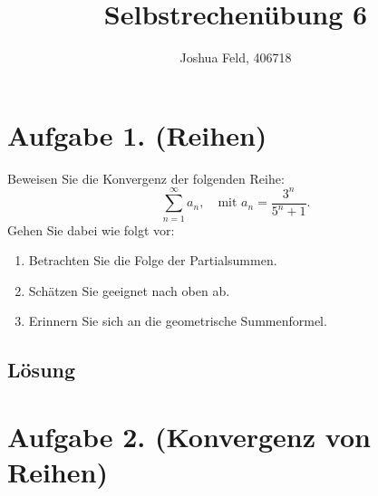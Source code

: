 \documentclass[german,12pt]{homework}
\title{Selbstrechenübung 6}
\author{Joshua Feld, 406718}
\institute{RWTH Aachen University\\Center for Computational Engineering Science}
\begin{document}
    \maketitle

    \section*{Aufgabe 1. (Reihen)}

    \begin{problem}
        Beweisen Sie die Konvergenz der folgenden Reihe:
        \[\sum_{n = 1}^\infty{a_n}, \quad \text{mit }a_n = \frac{3^n}{5^n +
        1}.\]
        Gehen Sie dabei wie folgt vor:
        \begin{enumerate}
            \item Betrachten Sie die Folge der Partialsummen.
            \item Schätzen Sie geeignet nach oben ab.
            \item Erinnern Sie sich an die geometrische Summenformel.
        \end{enumerate}
    \end{problem}

    \subsection*{Lösung}

    \section*{Aufgabe 2. (Konvergenz von Reihen)}
\end{document}
